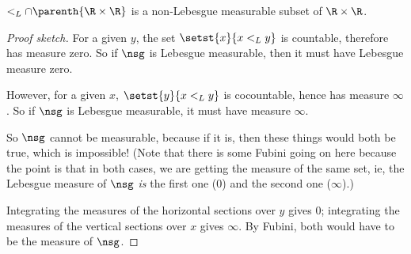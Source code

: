 \begin{boxlemma}
    $<_L \cap \parenth{\R \times \R}$ is a non-Lebesgue measurable subset of $\R \times \R$.
\end{boxlemma}
\begin{proof}[Proof sketch]
    For a given $y$, the set $\setst{x}{x <_L y}$ is countable, therefore has measure zero. So if $\nsg$ is Lebesgue measurable, then it must have Lebesgue measure zero.
    
    However, for a given $x$, $\setst{y}{x <_L y}$ is cocountable, hence has measure $\infty$. So if $\nsg$ is Lebesgue measurable, it must have measure $\infty$.

    So $\nsg$ cannot be measurable, because if it is, then these things would both be true, which is impossible! (Note that there is some Fubini going on here because the point is that in both cases, we are getting the measure of the same set, ie, the Lebesgue measure of $\nsg$ \textit{is} the first one ($0$) and the second one ($\infty$).)
    \begin{figure}[H]
        \centering
    \end{figure}
    Integrating the measures of the horizontal sections over $y$ gives $0$; integrating the measures of the vertical sections over $x$ gives $\infty$. By Fubini, both would have to be the measure of $\nsg$.
\end{proof}
